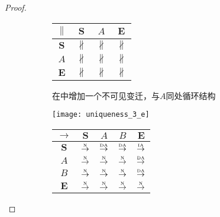 \begin{proof}
\begin{figure}[htbp]
\begin{subfigure}{1\textwidth}
\begin{minipage}[b]{0.3\textwidth}
\begin{tabular}{|c|c|c|c|}
        $\parallel$ & $\bm{S}$ & $A$ & $\bm{E}$\\ \hline
        $\bm{S}$ & $\nparallel$ & $\nparallel$ & $\nparallel$\\ \hline
        $A$ & $\nparallel$ & $\nparallel$ & $\nparallel$\\ \hline
        $\bm{E}$ & $\nparallel$ & $\nparallel$ & $\nparallel$\\ \hline
      \end{tabular}
    \end{minipage}
    \caption{在中增加一个不可见变迁，与$A$同处循环结构}
    \label{fig:uniqueness_3_d}
  \end{subfigure}

  \begin{subfigure}{1\textwidth}
    \vspace{1em}
    \centering
    \begin{minipage}[b]{1\textwidth}
      \centering
      \texttt{[image: uniqueness\_3\_e]}
    \end{minipage}
    \begin{minipage}[b]{0.3\textwidth}
      \vspace{1em}
      \centering
      \begin{tabular}{|c|c|c|c|c|} \hline
        $\rightarrow$ & $\bm{S}$ & $A$ & $B$ & $\bm{E}$\\ \hline
        $\bm{S}$ & $\overset{\text{\tiny{N}}}{\rightarrow}$ & $\overset{\text{\tiny{DA}}}{\rightarrow}$ & $\overset{\text{\tiny{DA}}}{\rightarrow}$ & $\overset{\text{\tiny{IA}}}{\rightarrow}$\\ \hline
        $A$ & $\overset{\text{\tiny{N}}}{\rightarrow}$ & $\overset{\text{\tiny{N}}}{\rightarrow}$ & $\overset{\text{\tiny{N}}}{\rightarrow}$ & $\overset{\text{\tiny{DA}}}{\rightarrow}$\\ \hline
        $B$ & $\overset{\text{\tiny{N}}}{\rightarrow}$ & $\overset{\text{\tiny{N}}}{\rightarrow}$ & $\overset{\text{\tiny{N}}}{\rightarrow}$ & $\overset{\text{\tiny{DA}}}{\rightarrow}$\\ \hline
        $\bm{E}$ & $\overset{\text{\tiny{N}}}{\rightarrow}$ & $\overset{\text{\tiny{N}}}{\rightarrow}$ & $\overset{\text{\tiny{N}}}{\rightarrow}$ & $\overset{\text{\tiny{N}}}{\rightarrow}$\\ \hline
      \end{tabular}
    \end{minipage}
    \begin{minipage}[b]{0.3\textwidth}

\end{minipage}
\end{subfigure}
\end{figure}
\end{proof}
